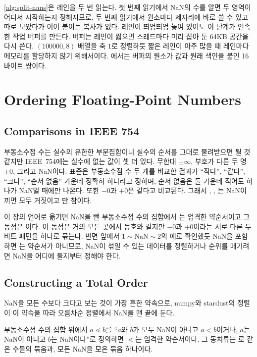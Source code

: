 \cref{alg:split-nans}은 레인을 두 번 읽는다. 첫 번째 읽기에서 NaN의 수를 알면 두 영역이 어디서 시작하는지 정해지므로, 두 번째 읽기에서 원소마다 제자리에 바로 쓸 수 있고 따로 모았다가 이어 붙이는 복사가 없다. 레인이 띄엄띄엄 놓여 있어도 이 단계가 연속한 작업 버퍼를 만든다. 버퍼는 레인이 짧으면 스레드마다 미리 잡아 둔 64KB 공간을 다시 쓴다. $(100000,8)$ 배열을 축 $1$로 정렬하듯 짧은 레인이 아주 많을 때 레인마다 메모리를 할당하지 않기 위해서이다. 에서는 버퍼의 원소가 값과 원래 색인을 붙인 16바이트 쌍이다.


\section{Ordering Floating-Point Numbers}
\label{sec:float-order}

\subsection{Comparisons in IEEE 754}

부동소수점 수는 실수의 유한한 부분집합이니 실수의 순서를 그대로 물려받으면 될 것 같지만 IEEE~754에는 실수에 없는 값이 셋 더 있다. 무한대 $\pm\infty$, 부호가 다른 두 영 $\pm0$, 그리고 NaN이다. 표준은 부동소수점 수 두 개를 비교한 결과가 ``작다'', ``같다'', ``크다'', ``순서 없음'' 가운데 정확히 하나라고 정하며, 순서 없음은 둘 가운데 적어도 하나가 NaN일 때에만 나온다\cite{ieee754-2019}. 또한 $-0$과 $+0$은 같다고 비교된다. 그래서 \code{<}, \code{<=}, \code{==}는 NaN이 끼면 모두 거짓이고 \code{!=}만 참이다.

이 장의 언어로 옮기면 NaN을 뺀 부동소수점 수의 집합에서 \code{<}는 엄격한 약순서이고 그 동점은 \code{==}이다. 이 동점은 거의 모든 곳에서 등호와 같지만 $-0$과 $+0$이라는 서로 다른 두 비트 패턴을 하나로 묶는다. 반면 앞에서 $1\sim\text{NaN}\sim2$의 예로 확인했듯 NaN을 포함하면 \code{<}는 약순서가 아니므로, NaN이 섞일 수 있는 데이터를 정렬하거나 순위를 매기려면 NaN을 어디에 둘지부터 정해야 한다.

\subsection{Constructing a Total Order}

NaN을 모든 수보다 크다고 보는 것이 가장 흔한 약속으로, numpy와 stardust의 정렬이 이 약속을 따라 오름차순 정렬에서 NaN을 맨 끝에 둔다.

\begin{proposition}
\label{prop:nan-last}
부동소수점 수의 집합 위에서 $a\lessdot b$를 ``$a$와 $b$가 모두 NaN이 아니고 $a<b$이거나, $a$는 NaN이 아니고 $b$는 NaN이다''로 정의하면 $\lessdot$는 엄격한 약순서이다. 그 동치류는 \code{==}로 같은 수들의 묶음과, 모든 NaN을 모은 묶음 하나이다.
\end{proposition}

